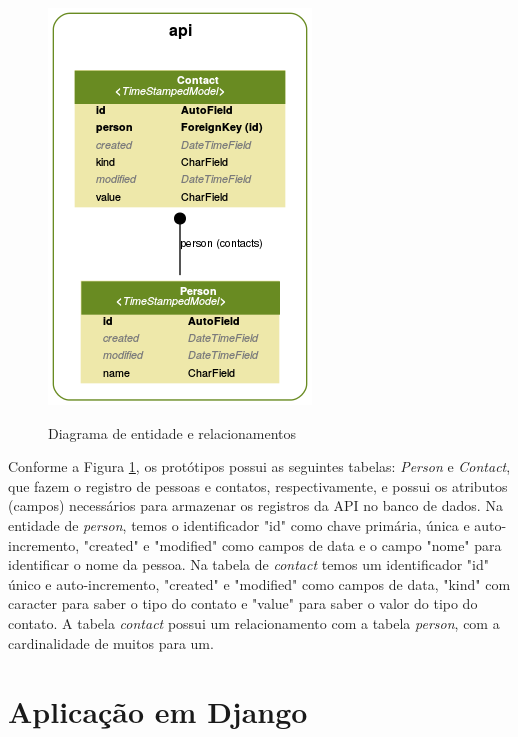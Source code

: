   \begin{figure}[H]
    \setlength{\abovecaptionskip}{0pt}
    \setlength{\belowcaptionskip}{0pt}
    \caption[Diagrama de entidade e relacionamentos]{Diagrama de entidade e relacionamentos}
    \centering
    \includegraphics[width=.55\textwidth]{imagem/der.png}
    \captionsetup{justification=centering}
    \label{fig:der}
  \end{figure}

  Conforme a Figura \ref{fig:der}, os protótipos possui as seguintes tabelas: \textit{Person} e \textit{Contact},
  que fazem o registro de pessoas e contatos, respectivamente, e possui os atributos (campos) necessários
  para armazenar os registros da API no banco de dados. Na entidade de \textit{person}, temos o identificador
  "id" como chave primária, única e auto-incremento, "created" e "modified" como campos de data e o campo
  "nome" para identificar o nome da pessoa. Na tabela de \textit{contact} temos um identificador "id" único e auto-incremento,
  "created" e "modified" como campos de data, "kind" com caracter para saber o tipo do contato e "value" para 
  saber o valor do tipo do contato. A tabela \textit{contact} possui um relacionamento com a tabela \textit{person},
  com a cardinalidade de muitos para um.

  
\section{Aplicação em Django}
\label{desenvolvimento-django}

